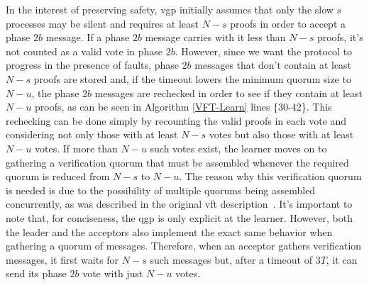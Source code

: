 In the interest of preserving safety, \acrshort{vgp} initially assumes that only the slow $s$ processes may be silent and requires at least $N-s$ proofs in order to accept a phase $2b$ message. If a phase $2b$ message carries with it less than $N-s$ proofs, it's not counted as a valid vote in phase $2b$. However, since we want the protocol to progress in the presence of faults, phase $2b$ messages that don't contain at least $N-s$ proofs are stored and, if the timeout lowers the minimum quorum size to $N-u$, the phase $2b$ messages are rechecked in order to see if they contain at least $N-u$ proofs, as can be seen in Algorithm \ref{VFT-Learn} lines \{30-42\}. {\color{red} This rechecking can be done simply by recounting the valid proofs in each vote and considering not only those with at least $N-s$ votes but also those with at least $N-u$ votes. If more than $N-u$ such votes exist, the learner moves on to gathering a verification quorum that must be assembled whenever the required quorum is reduced from $N-s$ to $N-u$. The reason why this verification quorum is needed is due to the possibility of multiple quorums being assembled concurrently, as was described in the original \acrshort{vft} description~\cite{Porto2015}.} It's important to note that, for conciseness, the \acrshort{qgp} is only explicit at the learner. However, both the leader and the acceptors also implement the exact same behavior when gathering a quorum of messages. Therefore, when an acceptor gathers verification messages, it first waits for $N-s$ such messages but, after a timeout of $3T$, it can send its phase $2b$ vote with just $N-u$ votes.\par

